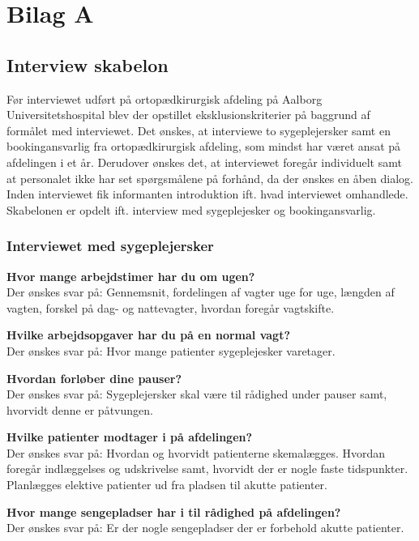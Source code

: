\chapter{Bilag A}

\section{Interview skabelon} \label{bilagA}
Før interviewet udført på ortopædkirurgisk afdeling på Aalborg Universitetshospital blev der opstillet eksklusionskriterier på baggrund af formålet med interviewet. Det ønskes, at interviewe to sygeplejersker samt en bookingansvarlig fra ortopædkirurgisk afdeling, som mindst har været ansat på afdelingen i et år. Derudover ønskes det, at interviewet foregår individuelt samt at personalet ikke har set spørgsmålene på forhånd, da der ønskes en åben dialog. Inden interviewet fik informanten introduktion ift. hvad interviewet omhandlede. Skabelonen er opdelt ift. interview med sygeplejesker og bookingansvarlig. 

\subsection{Interviewet med sygeplejersker}
\textbf{Hvor mange arbejdstimer har du om ugen?} \\
\noindent
Der ønskes svar på: Gennemsnit, fordelingen af vagter uge for uge, længden af vagten, forskel på dag- og nattevagter, hvordan foregår vagtskifte. 

\noindent
\textbf{Hvilke arbejdsopgaver har du på en normal vagt?} \\
\noindent
Der ønskes svar på: Hvor mange patienter sygeplejesker varetager. 

\noindent
\textbf{Hvordan forløber dine pauser?} \\
\noindent
Der ønskes svar på: Sygeplejersker skal være til rådighed under pauser samt, hvorvidt denne er påtvungen. 

\noindent
\textbf{Hvilke patienter modtager i på afdelingen?} \\
\noindent
Der ønskes svar på: Hvordan og hvorvidt patienterne skemalægges. Hvordan foregår indlæggelses og udskrivelse samt, hvorvidt der er nogle faste tidspunkter. Planlægges elektive patienter ud fra pladsen til akutte patienter.  

\noindent
\textbf{Hvor mange sengepladser har i til rådighed på afdelingen?}  \\
\noindent
Der ønskes svar på: Er der nogle sengepladser der er forbehold akutte patienter.


